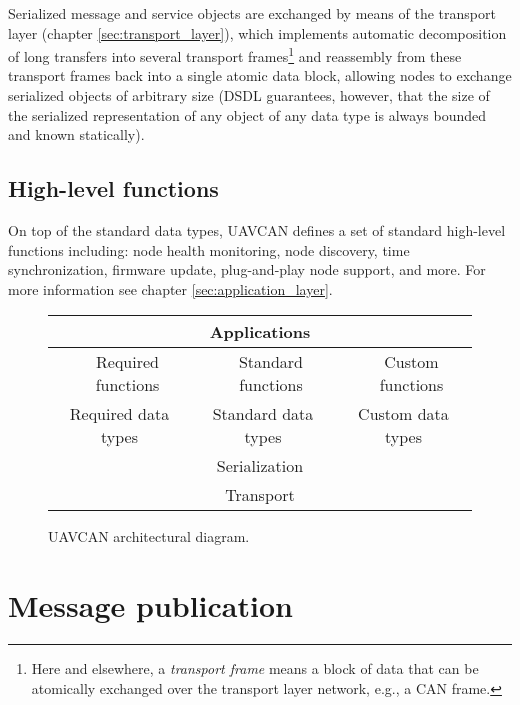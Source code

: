Serialized message and service objects are exchanged by means of the transport
layer (chapter \ref{sec:transport_layer}), which implements automatic decomposition of
long transfers into several transport frames\footnote{Here and
elsewhere, a \emph{transport frame} means a block of data that can be atomically exchanged
over the transport layer network, e.g., a CAN frame.} and reassembly from these transport frames
back into a single atomic data block, allowing nodes to exchange serialized objects of
arbitrary size (DSDL guarantees, however, that the size of the serialized representation
of any object of any data type is always bounded and known statically).

\subsection{High-level functions}

On top of the standard data types, UAVCAN defines a set of standard high-level functions including:
node health monitoring, node discovery, time synchronization, firmware update,
plug-and-play node support, and more.
For more information see chapter \ref{sec:application_layer}.

\begin{figure}[hbt]
    \centering
    \begin{tabular}{|c|c|l|c|l|c|}
        \hline
        \multicolumn{6}{|c|}{Applications} \\ \hline

        \qquad{} & Required functions &
        \qquad{} & Standard functions &
        \qquad{} & Custom functions \\
        \cline{2-2} \cline{4-4} \cline{6-6}

        \multicolumn{2}{|c|}{Required data types} &
        \multicolumn{2}{c|}{Standard data types} &
        \multicolumn{2}{c|}{Custom data types} \\ \hline

        \multicolumn{6}{|c|}{Serialization} \\ \hline

        \multicolumn{6}{|c|}{Transport} \\ \hline
    \end{tabular}
    \caption{UAVCAN architectural diagram.\label{fig:architecture}}
\end{figure}

\section{Message publication}

